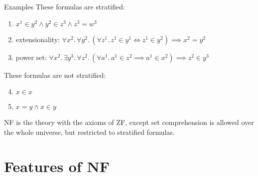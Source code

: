 \documentclass[xcolor=dvipsnames]{beamer}
\begin{document}
\begin{frame}{Examples}
    These formulas are stratified:
    \begin{enumerate}
        \item \( x^1 \in y^2 \wedge y^2 \in z^3 \wedge z^3 = w^3 \)
        \item extensionality: \( \forall x^2.\, \forall y^2.\, (\forall z^1.\, z^1 \in y^1 \iff z^1 \in y^2) \implies x^2 = y^2 \)
        \item power set: \( \forall x^2.\, \exists y^3.\, \forall z^2.\, (\forall a^1.\, a^1 \in z^2 \implies a^1 \in x^2) \implies z^2 \in y^3 \)
    \end{enumerate}
    These formulas are not stratified:
    \begin{enumerate}
        \setcounter{enumi}{3}
        \item \( x \in x \)
        \item \( x = y \wedge x \in y \)
    \end{enumerate}
    NF is the theory with the axioms of ZF, except set comprehension is allowed over the whole universe, but restricted to stratified formulas.
\end{frame}


\section{Features of NF}
\end{document}
